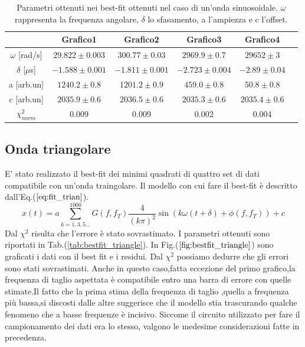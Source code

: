 \documentclass{article}
\begin{document}
            \begin{table}[H]
                \centering
                \begin{tabular}{cccccc}
                    \hline
                               & Grafico1              &Grafico2               & Grafico3                &Grafico4 \\
                    \hline
                    $\omega$ [rad/s]    & $29.822\pm 0.003$     & $300.77 \pm 0.03$     & $2969.9\pm 0.7$         & $29652  \pm 3$ \\
                    $\delta$ [$\mu$s]   & $-1.588 \pm 0.001$    & $-1.811 \pm 0.001$    & $-2.723\pm 0.004$       & $-2.89 \pm 0.04$ \\
                    a [arb.un]          & $1240.2\pm 0.8$       & $1201.2\pm 0.9$        & $459.0 \pm 0.8$         & $50.8 \pm 0.8$ \\
                    c [arb.un]          & $2035.9 \pm 0.6$      & $2036.5 \pm 0.6$      & $2035.3 \pm 0.6$        & $2035.4 \pm 0.6$ \\
                    $\chi^{2}_{norm}$   & 0.009                 & 0.009                 & 0.002                   & 0.004 \\
                    \hline
                \end{tabular}
                \caption{Parametri ottenuti nei best-fit ottenuti nel caso di un'onda sinuosoidale. $\omega$ rappresenta la frequenza angolare, $\delta$ lo sfasamento, a l'ampiezza e c l'offset.}
                \label{tab:bestfit_sinusoid}
            \end{table}

    \subsection{Onda triangolare}
        \label{sez:bestfit_trian}
        E' stato realizzato il best-fit dei minimi quadrati
        di quattro set di dati compatibile con un'onda traingolare.
         Il modello con cui fare il best-fit è descritto dall'Eq.($\ref{eq:fit_trian}$).
            \begin{equation}
                x(t) = a\sum_{k=1,3,5...}^{1000} G(f,f_T)\frac{4}{(k\pi)^2}\sin\left(k\omega (t+\delta)+\phi(f,f_T)\right) +c
                \label{eq:fit_trian}
            \end{equation} 
        Dal $\chi^2$ risulta che l'errore è stato sovrastimato. 
        I parametri ottenuti sono riportati in Tab.(\ref{tab:bestfit_triangle}).%
        In Fig.($\ref{fig:bestfit_triangle}$) sono graficati i dati con il best fit e 
        i residui. Dal $\chi^2$ possiamo dedurre che gli errori sono stati sovrastimati.
        Anche in questo caso,fatta eccezione del primo grafico,la frequenza di taglio aspettata 
        è compatibile entro una  barra di errore con quelle stimate.Il fatto che la prima stima  della
        frequenza  di taglio ,quella a frequenza più bassa,si discosti dalle altre suggerisce
        che il modello stia trascurando qualche fenomeno che a basse frequenze è incisivo.
        Siccome il circuito utilizzato per fare il campionamento dei dati era lo stesso, valgono le medesime considerazioni fatte in precedenza.
       
\end{document}

